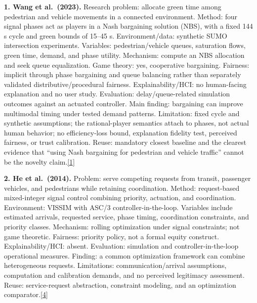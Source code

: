 \documentclass[
  english,
  11pt,
  a4paper,
]{article}
\begin{document}
\textbf{1. Wang et al.~(2023).} Research problem: allocate green time
among pedestrian and vehicle movements in a connected environment.
Method: four signal phases act as players in a Nash bargaining solution
(NBS), with a fixed 144 s cycle and green bounds of 15--45 s.
Environment/data: synthetic SUMO intersection experiments. Variables:
pedestrian/vehicle queues, saturation flows, green time, demand, and
phase utility. Mechanism: compute an NBS allocation and seek queue
equalization. Game theory: yes, cooperative bargaining. Fairness:
implicit through phase bargaining and queue balancing rather than
separately validated distributive/procedural fairness.
Explainability/HCI: no human-facing explanation and no user study.
Evaluation: delay/queue-related simulation outcomes against an actuated
controller. Main finding: bargaining can improve multimodal timing under
tested demand patterns. Limitation: fixed cycle and synthetic
assumptions; the rational-player semantics attach to phases, not actual
human behavior; no efficiency-loss bound, explanation fidelity test,
perceived fairness, or trust calibration. Reuse: mandatory closest
baseline and the clearest evidence that ``using Nash bargaining for
pedestrian and vehicle traffic'' cannot be the novelty
claim.\hyperref[source-1]{[1]}

\textbf{2. He et al.~(2014).} Problem: serve competing requests from
transit, passenger vehicles, and pedestrians while retaining
coordination. Method: request-based mixed-integer signal control
combining priority, actuation, and coordination. Environment: VISSIM
with ASC/3 controller-in-the-loop. Variables include estimated arrivals,
requested service, phase timing, coordination constraints, and priority
classes. Mechanism: rolling optimization under signal constraints; not
game theoretic. Fairness: priority policy, not a formal equity
construct. Explainability/HCI: absent. Evaluation: simulation and
controller-in-the-loop operational measures. Finding: a common
optimization framework can combine heterogeneous requests. Limitations:
communication/arrival assumptions, computation and calibration demands,
and no perceived legitimacy assessment. Reuse: service-request
abstraction, constraint modeling, and an optimization
comparator.\hyperref[source-4]{[4]}
\end{document}
